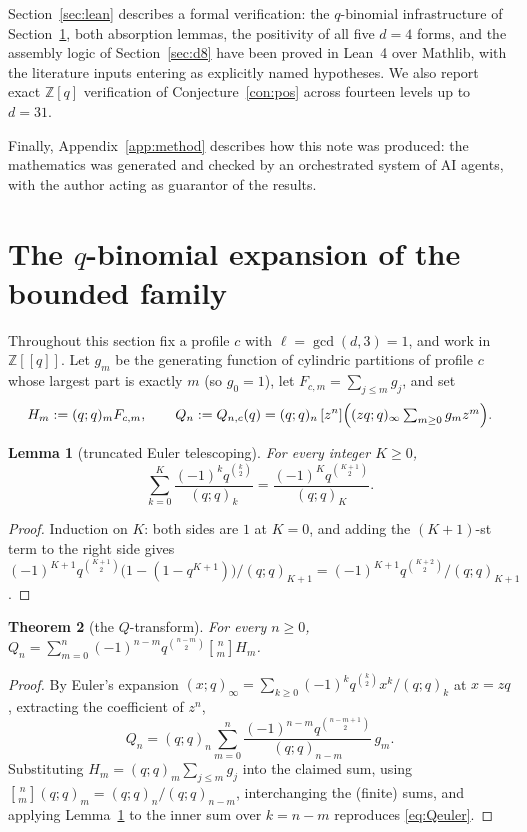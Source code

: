 \documentclass[11pt]{article}
\newtheorem{theorem}{Theorem}[section]
\newtheorem{lemma}[theorem]{Lemma}
\newcommand{\qbin}[2]{\genfrac{[}{]}{0pt}{}{#1}{#2}}
\newcommand{\poch}[1]{(q;q)_{#1}}
\newcommand{\ZZ}{\mathbb{Z}}
\begin{document}
Section~\ref{sec:lean} describes a formal verification: the $q$-binomial
infrastructure of Section~\ref{sec:equiv}, both absorption lemmas, the
positivity of all five $d=4$ forms, and the assembly logic of
Section~\ref{sec:d8} have been proved in Lean~4 over Mathlib, with the
literature inputs entering as explicitly named hypotheses. We also report
exact $\ZZ[q]$ verification of Conjecture~\ref{con:pos} across fourteen
levels up to $d=31$.

Finally, Appendix~\ref{app:method} describes how this note was produced:
the mathematics was generated and checked by an orchestrated system of AI
agents, with the author acting as guarantor of the results.

\section{The $q$-binomial expansion of the bounded family}
\label{sec:equiv}

Throughout this section fix a profile $c$ with $\ell=\gcd(d,3)=1$, and
work in $\ZZ[[q]]$. Let $g_m$ be the generating function of cylindric
partitions of profile $c$ whose largest part is exactly $m$ (so $g_0=1$),
let $F_{c,m}=\sum_{j\le m}g_j$, and set
\[
H_m:=\poch{m}F_{c,m},\qquad
Q_n:=Q_{n,c}(q)=\poch{n}\,[z^n]\Bigl((zq;q)_\infty
\textstyle\sum_{m\ge0}g_mz^m\Bigr).
\]

\begin{lemma}[truncated Euler telescoping]\label{lem:E}
For every integer $K\ge 0$,
\[
\sum_{k=0}^{K}\frac{(-1)^k q^{\binom{k}{2}}}{\poch{k}}
=\frac{(-1)^K q^{\binom{K+1}{2}}}{\poch{K}} .
\]
\end{lemma}

\begin{proof}
Induction on $K$: both sides are $1$ at $K=0$, and adding the
$(K{+}1)$-st term to the right side gives
$(-1)^{K+1}q^{\binom{K+1}{2}}\bigl(1-(1-q^{K+1})\bigr)/\poch{K+1}
=(-1)^{K+1}q^{\binom{K+2}{2}}/\poch{K+1}$.
\end{proof}

\begin{theorem}[the $Q$-transform]\label{thm:Q}
For every $n\ge 0$,
$\displaystyle
Q_n=\sum_{m=0}^{n}(-1)^{n-m}q^{\binom{n-m}{2}}\qbin{n}{m}H_m$.
\end{theorem}

\begin{proof}
By Euler's expansion $(x;q)_\infty=\sum_{k\ge0}(-1)^kq^{\binom{k}{2}}
x^k/\poch{k}$ at $x=zq$, extracting the coefficient of $z^n$,
\begin{equation}\label{eq:Qeuler}
Q_n=\poch{n}\sum_{m=0}^{n}
\frac{(-1)^{n-m}q^{\binom{n-m+1}{2}}}{\poch{n-m}}\,g_m .
\end{equation}
Substituting $H_m=\poch{m}\sum_{j\le m}g_j$ into the claimed sum, using
$\qbin{n}{m}\poch{m}=\poch{n}/\poch{n-m}$, interchanging the (finite)
sums, and applying Lemma~\ref{lem:E} to the inner sum over $k=n-m$
reproduces \eqref{eq:Qeuler}.
\end{proof}
\end{document}
